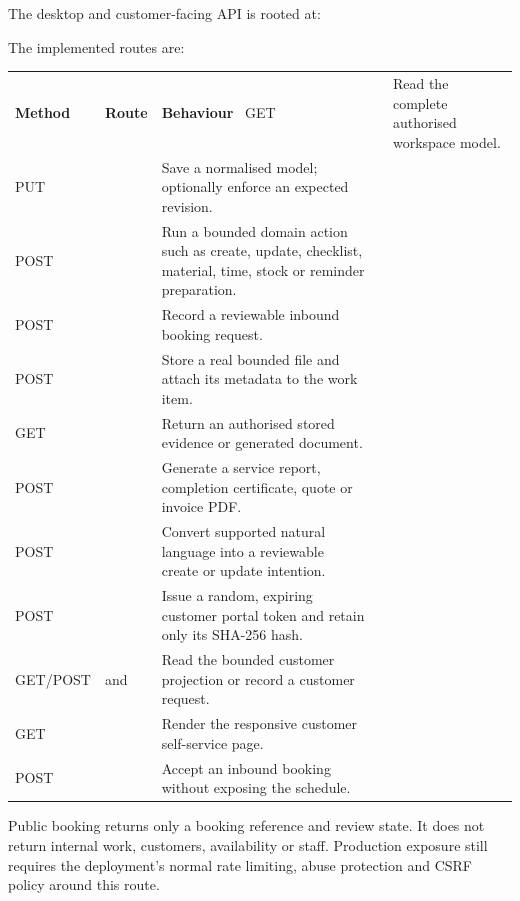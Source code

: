 The desktop and customer-facing API is rooted at:
\begin{center}\small
{}
\end{center}
The implemented routes are:
\begin{longtable}{p{.18\linewidth}p{.40\linewidth}p{.34\linewidth}}
\textbf{Method} & \textbf{Route} & \textbf{Behaviour}\ \hline
GET &  & Read the complete authorised workspace model.\\
PUT &  & Save a normalised model; optionally enforce an expected revision.\\
POST &  & Run a bounded domain action such as create, update, checklist, material, time, stock or reminder preparation.\\
POST &  & Record a reviewable inbound booking request.\\
POST &  & Store a real bounded file and attach its metadata to the work item.\\
GET &  & Return an authorised stored evidence or generated document.\\
POST &  & Generate a service report, completion certificate, quote or invoice PDF.\\
POST &  & Convert supported natural language into a reviewable create or update intention.\\
POST &  & Issue a random, expiring customer portal token and retain only its SHA-256 hash.\\
GET/POST &  and  & Read the bounded customer projection or record a customer request.\\
GET &  & Render the responsive customer self-service page.\\
POST &  & Accept an inbound booking without exposing the schedule.\\
\end{longtable}

Public booking returns only a booking reference and review state.  It does not
return internal work, customers, availability or staff.  Production exposure
still requires the deployment's normal rate limiting, abuse protection and CSRF
policy around this route.

